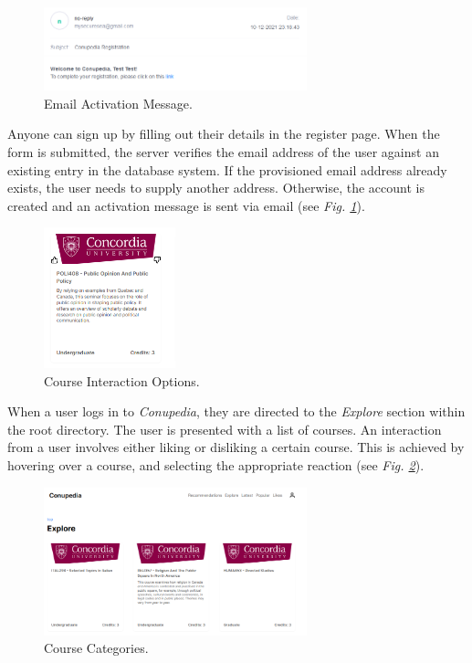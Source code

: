 \documentclass[conference]{IEEEtran}
\begin{document}
            
            \begin{figure}[htbp]
            \centering
            \includegraphics[width=3.0in]{img/email.png}
            \caption{Email Activation Message.}
            \label{email}
            \end{figure}
            
            
            Anyone can sign up by filling out their details in the register page.
            When the form is submitted, the server verifies the email address of the user against an existing entry in the database system.
            If the provisioned email address already exists, the user needs to supply another address.
            Otherwise, the account is created and an activation message is sent via email (see \textit{Fig. \ref{email}}).
            
            \begin{figure}[H]
            \centering
            \includegraphics[width=1.5in]{img/course_interaction.png}
            \caption{Course Interaction Options.}
            \label{course_interaction}
            \end{figure}
            
            When a user logs in to \textit{Conupedia}, they are directed to the \textit{Explore} section within the root directory.
            The user is presented with a list of courses.
            An interaction from a user involves either liking or disliking a certain course.
            This is achieved by hovering over a course, and selecting the appropriate reaction (see \textit{Fig. \ref{course_interaction}}).
            
            
            \begin{figure}[H]
            \centering
            \includegraphics[width=3.0in]{img/headline.png}
            \caption{Course Categories.}
            \label{headline}
            \end{figure}
            
\end{document}
